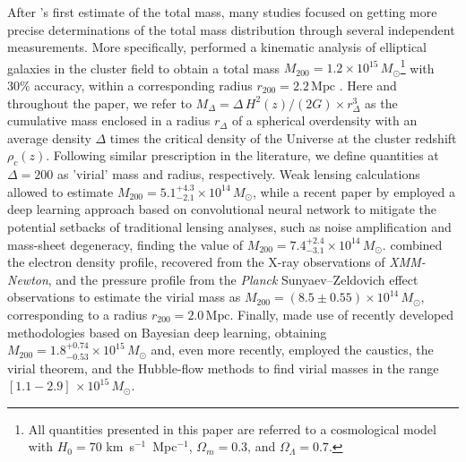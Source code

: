 \documentclass{aa}
\begin{document}
\medskip
After \citet{Zwicky33}'s first estimate of the total mass, many studies focused on getting more precise determinations of the total mass distribution through several independent measurements. More specifically, \citet{Lokas_2003} performed a kinematic analysis of elliptical galaxies in the cluster field to obtain a total mass $M_{200} = 1.2 \times 10^{15} \, M_\odot$\footnote{All quantities presented in this paper are referred to a cosmological model with $H_0=70$ km~s$^{-1}$~Mpc$^{-1}$, $\Omega_m=0.3$, and $\Omega_{\Lambda}=0.7$.} with $30\%$ accuracy, within a corresponding radius $r_{200}=2.2 \, \mathrm{Mpc}$ . Here and throughout the paper, we refer to  $M_\Delta = \Delta \,H^2(z)/(2G)\times r_{\Delta}^3$ as the cumulative mass enclosed in a radius $r_{\Delta}$ of a spherical overdensity with an average density $\Delta$ times the critical density of the Universe at the cluster redshift $\rho_{c}(z)$. Following similar prescription in the literature, we define quantities at $\Delta = 200$ as 'virial' mass and radius, respectively. %
Weak lensing calculations allowed \citet{Gavazzi_2009} to estimate $M_{200}=5.1^{+4.3}_{-2.1} \times 10^{14} \, M_\odot$, while a recent paper by \citet{Cha_2025} employed a deep learning approach based on convolutional neural network to mitigate the potential setbacks of traditional lensing analyses, such as noise amplification and mass-sheet degeneracy, finding the value of $M_{200}=7.4^{+2.4}_{-3.1} \times 10^{14} \, M_\odot$. \citet{Mirakhor_2020} combined the electron density profile, recovered from the X-ray observations of \textit{XMM-Newton}, and the pressure profile from the \textit{Planck} Sunyaev--Zeldovich effect~\citep[SZ,][]{Sunyaev1972} observations to estimate the virial mass as $M_{200}=(8.5 \pm 0.55) \times 10^{14} \, M_\odot$, corresponding to a radius $r_{200}=2.0 \, \mathrm{Mpc}$. Finally, \citet{Ho_2022} made use of recently developed methodologies based on Bayesian deep learning, obtaining $M_{200}=1.8^{+0.74}_{-0.53} \times 10^{15} \, M_\odot$ and, even more recently, \citet{Benisty25} employed the caustics, the virial theorem, and the Hubble-flow methods to find virial masses in the range $[1.1-2.9]\, \times 10^{15} \,  M_\odot$.
\end{document}
